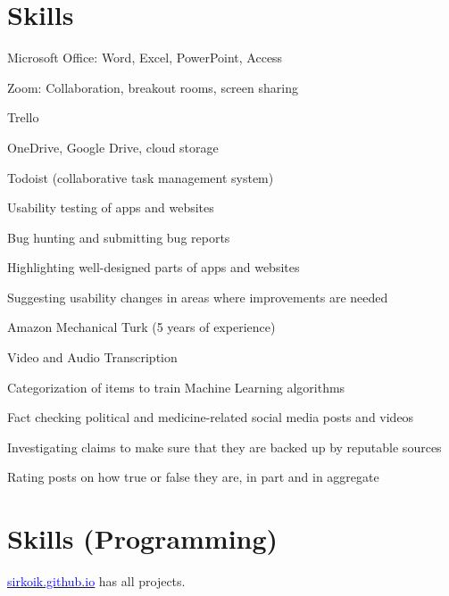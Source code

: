 \documentclass[]{deedy-resume-openfont}
\begin{document}
\section{Skills}
\descript{}
\begin{tightemize}
\item Microsoft Office: Word\footnotemark, Excel\footnotemark[\value{footnote}], PowerPoint, Access
\item Zoom: Collaboration, breakout rooms, screen sharing
\item Trello
\item OneDrive, Google Drive, cloud storage
\item Todoist (collaborative task management system)
\end{tightemize}
\sectionsep

\descript{}
\begin{tightemize}
\item Usability testing of apps and websites
\item Bug hunting and submitting bug reports
\item Highlighting well-designed parts of apps and websites
\item Suggesting usability changes in areas where improvements are needed
\end{tightemize}
\sectionsep

\descript{}
\begin{tightemize}
\item Amazon Mechanical Turk (5 years of experience)
\item Video and Audio Transcription
\item Categorization of items to train Machine Learning algorithms
\end{tightemize}
\sectionsep

\descript{}
\begin{tightemize}
\item Fact checking political and medicine-related social media posts and videos
\item Investigating claims to make sure that they are backed up by reputable sources
\item Rating posts on how true or false they are, in part and in aggregate
\end{tightemize}
\sectionsep

\newpage

\section{Skills (Programming)}
\descript{}
\begin{tightemize}
\item \href{https://sirkoik.github.io#projects}{\underline{\textcolor{blue}{sirkoik.github.io}}} has all projects.
\end{tightemize}
\sectionsep
\end{document}

